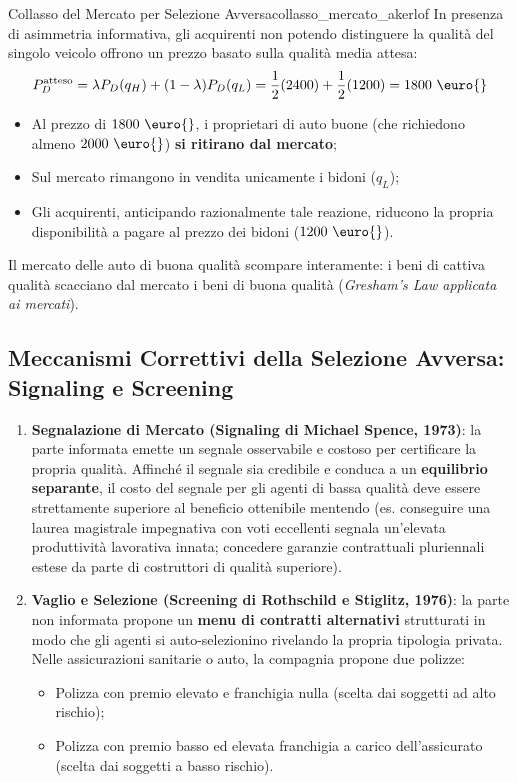 \begin{teorema}{Collasso del Mercato per Selezione Avversa}{collasso_mercato_akerlof}
In presenza di asimmetria informativa, gli acquirenti non potendo distinguere la qualità del singolo veicolo offrono un prezzo basato sulla qualità media attesa:
\begin{equation}
    P_D^{\text{atteso}} = \lambda P_D(q_H) + (1 - \lambda) P_D(q_L) = \frac{1}{2}(2400) + \frac{1}{2}(1200) = 1800\text{ \euro{}}
\end{equation}
\begin{itemize}
    \item Al prezzo di $1800\text{ \euro{}}$, i proprietari di auto buone (che richiedono almeno $2000\text{ \euro{}}$) \textbf{si ritirano dal mercato};
    \item Sul mercato rimangono in vendita unicamente i bidoni ($q_L$);
    \item Gli acquirenti, anticipando razionalmente tale reazione, riducono la propria disponibilità a pagare al prezzo dei bidoni ($1200\text{ \euro{}}$).
\end{itemize}
Il mercato delle auto di buona qualità scompare interamente: i beni di cattiva qualità scacciano dal mercato i beni di buona qualità (\textit{Gresham's Law applicata ai mercati}).
\end{teorema}

\subsection{Meccanismi Correttivi della Selezione Avversa: Signaling e Screening}
\begin{enumerate}
    \item \textbf{Segnalazione di Mercato (Signaling di Michael Spence, 1973)}: la parte informata emette un segnale osservabile e costoso per certificare la propria qualità. Affinché il segnale sia credibile e conduca a un \textbf{equilibrio separante}, il costo del segnale per gli agenti di bassa qualità deve essere strettamente superiore al beneficio ottenibile mentendo (es. conseguire una laurea magistrale impegnativa con voti eccellenti segnala un'elevata produttività lavorativa innata; concedere garanzie contrattuali pluriennali estese da parte di costruttori di qualità superiore).
    \item \textbf{Vaglio e Selezione (Screening di Rothschild e Stiglitz, 1976)}: la parte non informata propone un \textbf{menu di contratti alternativi} strutturati in modo che gli agenti si auto-selezionino rivelando la propria tipologia privata. Nelle assicurazioni sanitarie o auto, la compagnia propone due polizze:
    \begin{itemize}
        \item Polizza con premio elevato e franchigia nulla (scelta dai soggetti ad alto rischio);
        \item Polizza con premio basso ed elevata franchigia a carico dell'assicurato (scelta dai soggetti a basso rischio).
    \end{itemize}
\end{enumerate}

